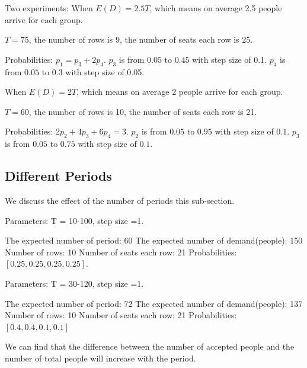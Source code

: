 Two experiments:
When $E(D) = 2.5T$, which means on average 2.5 people arrive for each group.

$T =75$, the number of rows is 9, the number of seats each row is 25.

Probabilities: 
$p_1 = p_3 + 2p_4$. $p_3$ is from $0.05$ to $0.45$ with step size of 0.1. $p_4$ is from $0.05$ to $0.3$ with step size of 0.05.


% 

When $E(D) = 2T$, which means on average 2 people arrive for each group.

$T = 60$, the number of rows is 10, the number of seats each row is 21.

Probabilities: 
$2p_2 + 4p_3 + 6p_4 =3$. $p_2$ is from $0.05$ to $0.95$ with step size of $0.1$. $p_3$ is from $0.05$ to $0.75$ with step size of $0.1$.


% 


\subsection{Different Periods}
We discuss the effect of the number of periods this sub-section. 

Parameters: T = 10-100, step size =1.

The expected number of period: 60
The expected number of demand(people): 150
Number of rows: 10
Number of seats each row: 21
Probabilities: $[0.25, 0.25, 0.25, 0.25]$.

Parameters: T = 30-120, step size =1.

The expected number of period: 72
The expected number of demand(people): 137
Number of rows: 10
Number of seats each row: 21
Probabilities: $[0.4, 0.4, 0.1, 0.1]$


% 
% 



We can find that the difference between the number of accepted people and the number of total people will increase with the period. 

